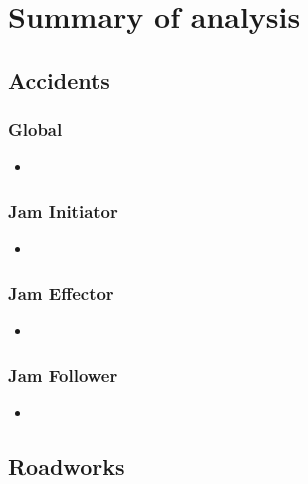 \chapter{Summary of analysis}


\section{Accidents}

\subsection{Global}

\begin{itemize}
    \item 
\end{itemize}

\subsection{Jam Initiator}

\begin{itemize}
    \item 
\end{itemize}

\subsection{Jam Effector}

\begin{itemize}
    \item 
\end{itemize}

\subsection{Jam Follower}

\begin{itemize}
    \item 
\end{itemize}

\section{Roadworks}


